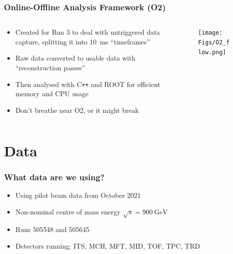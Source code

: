 \documentclass[11pt]{beamer}
\begin{document}
\begin{frame}
    \frametitle{Online-Offline Analysis Framework (O2)}

    \begin{columns}[c]
        \begin{column}{0.5\textwidth}
            \begin{itemize}
                \item Created for Run 3 to deal with untriggered data capture, splitting it into \SI{10}{\milli\second} ``timeframes''
                \item Raw data converted to usable data with ``reconstruction passes''
                \item Then analysed with C\texttt{++} and ROOT for efficient memory and CPU usage
                \item Don't breathe near O2, or it might break
            \end{itemize}
        \end{column}

        \begin{column}{0.5\textwidth}
            \begin{figure}
                \begin{center}
                    \texttt{[image: Figs/O2\_flow.png]}
                \end{center}
            \end{figure}
        \end{column}
    \end{columns}

\end{frame}

\section{Data}

\begin{frame}
    \frametitle{What data are we using?}

    \begin{itemize}
        \item Using pilot beam data from October 2021
        \item Non-nominal centre of mass energy $\sqrt{s}=\SI{900}{\giga\electronvolt}$
        \item Runs 505548 and 505645
        \item Detectors running: ITS, MCH, MFT, MID, TOF, TPC, TRD
    \end{itemize}

\end{frame}
\end{document}
